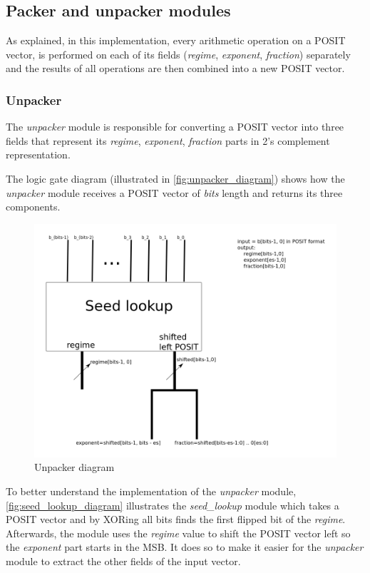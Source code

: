 \documentclass[10pt]{article}
\begin{document}
\subsection{Packer and unpacker modules}\label{sec:pack-unpack-modul}

As explained, in this implementation, every arithmetic operation on a POSIT
vector, is performed on each of its fields (\textit{regime}, \textit{exponent},
\textit{fraction}) separately and the results of all operations are then
combined into a new POSIT vector.

\subsubsection{Unpacker}\label{sec:unpacker}

The \textit{unpacker} module is responsible for converting a POSIT vector into
three fields that represent its \textit{regime}, \textit{exponent},
\textit{fraction} parts in 2's complement representation.

The logic gate diagram (illustrated in \autoref{fig:unpacker_diagram})
shows how the \textit{unpacker} module receives a POSIT vector of \textit{bits}
length and returns its three components.

\begin{figure}[h]
  \centering
  \includegraphics[width=\textwidth, height=0.2\paperheight]{unpacker_diagram}
  \caption{Unpacker diagram}
  \label{fig:unpacker_diagram}
\end{figure}

To better understand the implementation of the \textit{unpacker} module,
\autoref{fig:seed_lookup_diagram} illustrates the \textit{seed\_lookup} module
which takes a POSIT vector and by XORing all bits finds the first flipped bit
of the \textit{regime}.
Afterwards, the module uses the  \textit{regime} value to shift the POSIT vector left
so the \textit{exponent} part starts in the MSB. It does so to make it easier
for the \textit{unpacker} module to extract the other fields of the input vector.
\end{document}
